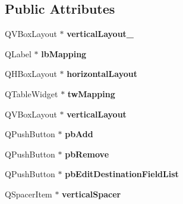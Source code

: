 \subsection*{Public Attributes}
\begin{DoxyCompactItemize}
\item 
\hypertarget{class_ui__mdt_field_map_dialog_ab02cee4966f301ecab7203d21905f62a}{
QVBoxLayout $\ast$ {\bfseries verticalLayout\_}}
\label{class_ui__mdt_field_map_dialog_ab02cee4966f301ecab7203d21905f62a}

\item 
\hypertarget{class_ui__mdt_field_map_dialog_aa508b425116eee11931533fb4ec7dace}{
QLabel $\ast$ {\bfseries lbMapping}}
\label{class_ui__mdt_field_map_dialog_aa508b425116eee11931533fb4ec7dace}

\item 
\hypertarget{class_ui__mdt_field_map_dialog_a833e4295c9d781adce6def558096f53d}{
QHBoxLayout $\ast$ {\bfseries horizontalLayout}}
\label{class_ui__mdt_field_map_dialog_a833e4295c9d781adce6def558096f53d}

\item 
\hypertarget{class_ui__mdt_field_map_dialog_a75ba0e1cbf124fb09f2e0d4e90f33c27}{
QTableWidget $\ast$ {\bfseries twMapping}}
\label{class_ui__mdt_field_map_dialog_a75ba0e1cbf124fb09f2e0d4e90f33c27}

\item 
\hypertarget{class_ui__mdt_field_map_dialog_a126ba01f2e1767c734682486db335960}{
QVBoxLayout $\ast$ {\bfseries verticalLayout}}
\label{class_ui__mdt_field_map_dialog_a126ba01f2e1767c734682486db335960}

\item 
\hypertarget{class_ui__mdt_field_map_dialog_a238f1b5debc76c3fff63e7a2b8c543d9}{
QPushButton $\ast$ {\bfseries pbAdd}}
\label{class_ui__mdt_field_map_dialog_a238f1b5debc76c3fff63e7a2b8c543d9}

\item 
\hypertarget{class_ui__mdt_field_map_dialog_a174e6dabe905ab4d0b45a24fd408ad20}{
QPushButton $\ast$ {\bfseries pbRemove}}
\label{class_ui__mdt_field_map_dialog_a174e6dabe905ab4d0b45a24fd408ad20}

\item 
\hypertarget{class_ui__mdt_field_map_dialog_aff6b12a8a09b3381c7910ed0d7a8e73b}{
QPushButton $\ast$ {\bfseries pbEditDestinationFieldList}}
\label{class_ui__mdt_field_map_dialog_aff6b12a8a09b3381c7910ed0d7a8e73b}

\item 
\hypertarget{class_ui__mdt_field_map_dialog_a0e77e0b333f2ba3b75e1661b44c44b58}{
QSpacerItem $\ast$ {\bfseries verticalSpacer}}
\label{class_ui__mdt_field_map_dialog_a0e77e0b333f2ba3b75e1661b44c44b58}


\end{DoxyCompactItemize}

